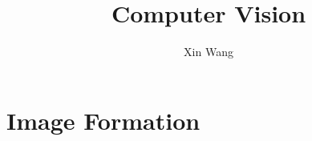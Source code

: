 \documentclass{report}
\title{Computer Vision}
\author{Xin Wang}
\begin{document}
\par
\maketitle
\medskip

\tableofcontents

\chapter{Image Formation}
\end{document}
